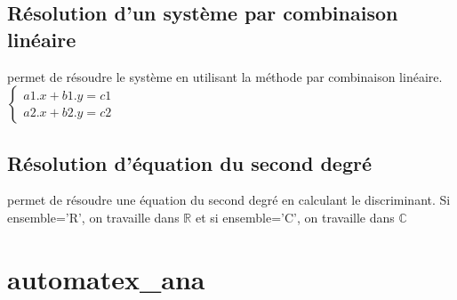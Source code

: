 \section{Résolution d'un système par combinaison linéaire}
 permet de résoudre le système en utilisant la méthode par combinaison linéaire.
$\left \{\begin{matrix}a1.x+b1.y=c1 \\a2.x+b2.y=c2 \end{matrix}\right.$
\section{Résolution d'équation du second degré}
 permet de résoudre une équation du second degré en calculant le discriminant. Si ensemble='R', on travaille dans $\mathbb{R}$ et si ensemble='C', on travaille dans $\mathbb{C}$
\chapter{automatex\_ana}



